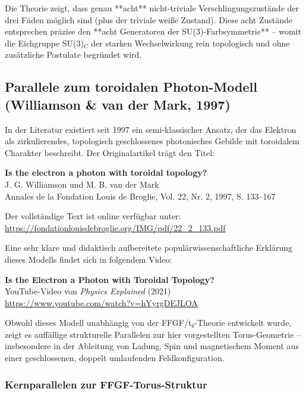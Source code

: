 \documentclass[12pt,a4paper]{article}
\begin{document}
	Die Theorie zeigt, dass genau **acht** nicht-triviale Verschlingungszustände der drei Fäden möglich sind (plus der triviale weiße Zustand). Diese acht Zustände entsprechen präzise den **acht Generatoren der SU(3)-Farbsymmetrie** – womit die Eichgruppe SU(3)$_C$ der starken Wechselwirkung rein topologisch und ohne zusätzliche Postulate begründet wird.
	
	\subsection{Parallele zum toroidalen Photon-Modell (Williamson \& van der Mark, 1997)}
	
	In der Literatur existiert seit 1997 ein semi-klassischer Ansatz, der das Elektron als zirkulierendes, topologisch geschlossenes photonisches Gebilde mit toroidalem Charakter beschreibt. Der Originalartikel trägt den Titel:
	
	\begin{center}
		\textbf{Is the electron a photon with toroidal topology?} \\
		J. G. Williamson und M. B. van der Mark \\
		Annales de la Fondation Louis de Broglie, Vol. 22, Nr. 2, 1997, S. 133--167
	\end{center}
	
	Der vollständige Text ist online verfügbar unter: \\
	\url{https://fondationlouisdebroglie.org/IMG/pdf/22_2_133.pdf}
	
	Eine sehr klare und didaktisch aufbereitete populärwissenschaftliche Erklärung dieses Modells findet sich in folgendem Video:
	
	\begin{center}
		\textbf{Is the Electron a Photon with Toroidal Topology?} \\
		YouTube-Video von \emph{Physics Explained} (2021) \\
		\url{https://www.youtube.com/watch?v=hYyrgDEJLOA}
	\end{center}
	
	Obwohl dieses Modell unabhängig von der FFGF/t₀-Theorie entwickelt wurde, zeigt es auffällige strukturelle Parallelen zur hier vorgestellten Torus-Geometrie – insbesondere in der Ableitung von Ladung, Spin und magnetischem Moment aus einer geschlossenen, doppelt umlaufenden Feldkonfiguration.
	
	\subsubsection{Kernparallelen zur FFGF-Torus-Struktur}
	
\end{document}
